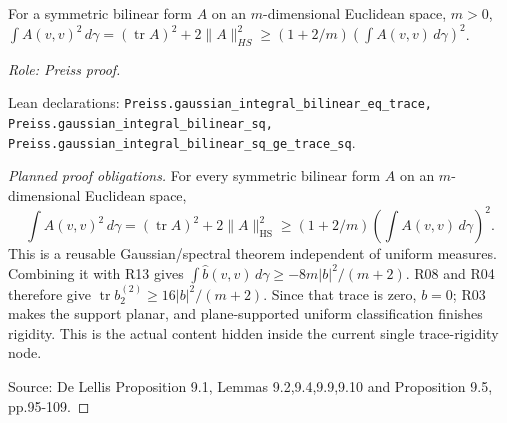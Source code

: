 \begin{lemma}
\label{lem:gaussian-quadratic-trace-bound}







For a symmetric bilinear form $A$ on an $m$-dimensional Euclidean space, $m>0$, $\int A(v,v)^2\,d\gamma=(\operatorname{tr}A)^2+2\|A\|_{HS}^2\geq(1+2/m)(\int A(v,v)\,d\gamma)^2$.
\par\emph{Role: Preiss proof.}
\par Lean declarations: \texttt{Preiss.gaussian\_integral\_bilinear\_eq\_trace, Preiss.gaussian\_integral\_bilinear\_sq, Preiss.gaussian\_integral\_bilinear\_sq\_ge\_trace\_sq}.
\end{lemma}
\begin{proof}[Planned proof obligations]

For every symmetric bilinear form $A$ on an $m$-dimensional Euclidean space,
\[
 \int A(v,v)^2\,d\gamma=(\operatorname{tr}A)^2+
 2\|A\|_{\mathrm{HS}}^2
 \geq(1+2/m)\left(\int A(v,v)\,d\gamma\right)^2.
\]
This is a reusable Gaussian/spectral theorem independent of uniform measures.
Combining it with R13 gives
$\int\widehat b(v,v)\,d\gamma\geq-8m|b|^2/(m+2)$.
R08 and R04 therefore give
$\operatorname{tr}b_2^{(2)}\geq16|b|^2/(m+2)$.
Since that trace is zero, $b=0$; R03 makes the support planar, and plane-supported
uniform classification finishes rigidity. This is the actual content hidden
inside the current single trace-rigidity node.
\par Source: De Lellis Proposition 9.1, Lemmas 9.2,9.4,9.9,9.10 and Proposition 9.5, pp.95-109.
\end{proof}

